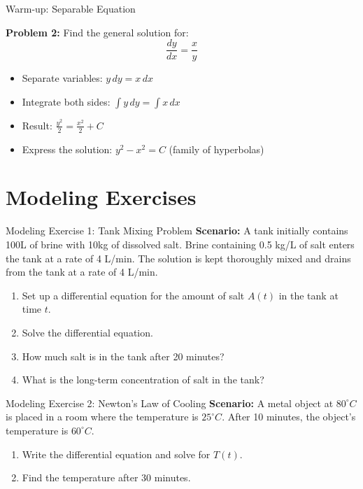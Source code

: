 \documentclass[10pt,aspectratio=169]{beamer}
\newcommand{\concept}[1]{\textbf{#1}}
\newcommand{\formula}[1]{\textit{#1}}
\begin{document}
\begin{frame}{Warm-up: Separable Equation}
    \begin{problembox}
        \concept{Problem 2:} Find the general solution for:
        \formula{\[ \frac{dy}{dx} = \frac{x}{y} \]}
    \end{problembox}
    
    \begin{solutionbox}
        \begin{itemize}
            \item Separate variables: $y \, dy = x \, dx$
            \item Integrate both sides: $\int y \, dy = \int x \, dx$
            \item Result: $\frac{y^2}{2} = \frac{x^2}{2} + C$
            \item Express the solution: $y^2 - x^2 = C$ (family of hyperbolas)
        \end{itemize}
    \end{solutionbox}
\end{frame}

\section{Modeling Exercises}
\begin{frame}{Modeling Exercise 1: Tank Mixing Problem}
    \concept{Scenario:} A tank initially contains 100L of brine with 10kg of dissolved salt. Brine containing 0.5 kg/L of salt enters the tank at a rate of 4 L/min. The solution is kept thoroughly mixed and drains from the tank at a rate of 4 L/min.
    \begin{enumerate}
        \item Set up a differential equation for the amount of salt $A(t)$ in the tank at time $t$.
        \item Solve the differential equation.
        \item How much salt is in the tank after 20 minutes?
        \item What is the long-term concentration of salt in the tank?
    \end{enumerate}
\end{frame}

\begin{frame}{Modeling Exercise 2: Newton's Law of Cooling}
    \concept{Scenario:} A metal object at $80^\circ C$ is placed in a room where the temperature is $25^\circ C$. After 10 minutes, the object's temperature is $60^\circ C$.
    \begin{enumerate}
        \item Write the differential equation and solve for $T(t)$.
        \item Find the temperature after 30 minutes.
    \end{enumerate}
\end{frame}
\end{document}
